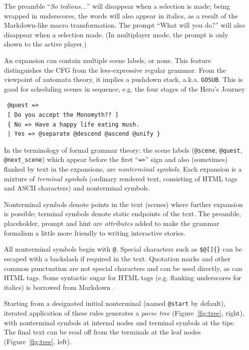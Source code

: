 \documentclass{acm_proc_article-sp}
\begin{document}
The preamble ``{\em So tedious...}'' will disappear when a selection is made; being wrapped in underscores, the words will also appear in italics, as a result of the Markdown-like macro transformation.
The prompt ``What will you do?'' will also disappear when a selection made.
(In multiplayer mode, the prompt is only shown to the active player.)

An expansion can contain multiple scene labels, or none. This feature distinguishes the CFG from the less-expressive regular grammar.
From the viewpoint of automata theory, it implies a pushdown stack, a.k.a. {\tt GOSUB}.
This is good for scheduling scenes in sequence, e.g. the four stages of the Hero's Journey
\begin{verbatim}
 @quest =>
 [ Do you accept the Monomyth?? ]
 { No => Have a happy life eating mush.
 | Yes => @separate @descend @ascend @unify }
\end{verbatim}


In the terminology of formal grammar theory: the scene labels ({\tt @scene}, {\tt @quest}, {\tt @next\_scene}) which appear before the first ``{\tt =>}'' sign and also (sometimes) flanked by text in the expansions, are {\em nonterminal symbols}.
Each expansion is a mixture of {\em terminal symbols} (ordinary rendered text, consisting of HTML tags and ASCII characters) and nonterminal symbols.

Nonterminal symbols denote points in the text (scenes) where further expansion is possible;
terminal symbols denote static endpoints of the text.
The preamble, placeholder, prompt and hint are {\em attributes}
added to make the grammar formalism a little more friendly to writing interactive stories.

All nonterminal symbols begin with {\tt @}.
Special characters such as {\tt \$@[]\{\}} can be escaped with a backslash if required in the text.
Quotation marks and other common punctuation are not special characters and can be used directly, as can HTML tags.
Some syntactic sugar for HTML tags (e.g. flanking underscores for italics) is borrowed from Markdown \cite{Markdown}.

Starting from a designated initial nonterminal (named {\tt @start} by default),
iterated application of these rules generates a {\em parse tree} (Figure~\ref{fig:tree}, right),
with nonterminal symbols at internal nodes and terminal symbols at the tips.
The final text can be read off from the terminals at the leaf nodes (Figure~\ref{fig:tree}, left).
\end{document}
